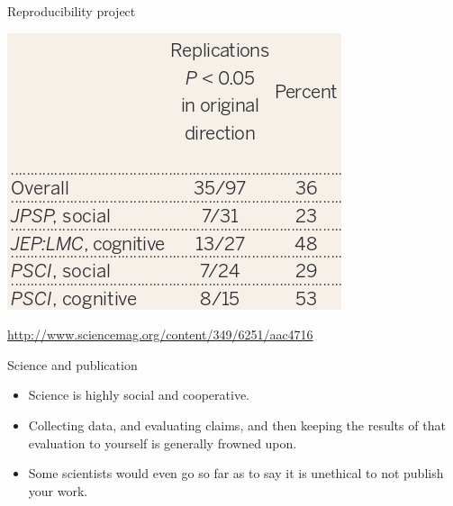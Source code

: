 \documentclass{beamer}
\begin{document}
\begin{frame}{Reproducibility project}
	\centerline{\includegraphics[width=.8\textwidth]{pics/nosek.png}}
	\url{http://www.sciencemag.org/content/349/6251/aac4716}
\end{frame}

\begin{frame}{Science and publication}
	\begin{itemize}
		\item Science is highly social and cooperative.
		\item Collecting data, and evaluating claims, and then keeping the results of that evaluation to yourself is generally frowned upon.
		\item Some scientists would even go so far as to say it is unethical to not publish your work. 
	\end{itemize}
\end{frame}
\end{document}
